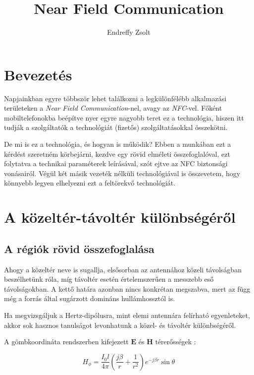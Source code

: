 \documentclass[12pt]{article}
\author{Endreffy Zsolt}
\title{Near Field Communication}
\begin{document}
\maketitle

\pagebreak

\tableofcontents

\pagebreak

\section{Bevezetés}
Napjainkban egyre többször lehet találkozni a legkülönfélébb alkalmazási 
területeken a \emph{Near Field Communication}-nel, avagy az \emph{NFC}-vel.
Főként mobiltelefonokba beépítve nyer egyre nagyobb teret ez a technológia,
hiszen itt tudják a szolgáltatók a technológiát (fizetős) szolgáltatásokkal
összekötni.

De mi is ez a technológia, és hogyan is működik?
Ebben a munkában ezt a kérdést szeretném körbejárni, kezdve egy rövid 
elméleti összefoglalóval, ezt folytatva a technikai paraméterek leírásával,
szót ejtve az NFC biztonsági vonásairól. Végül két másik vezeték nélküli
technológiával is összevetem, hogy könnyebb legyen elhelyezni ezt a 
feltörekvő technológiát.

\section{A közeltér-távoltér különbségéről}

\subsection{A régiók rövid összefoglalása}
Ahogy a közeltér neve is sugallja, elsősorban az antennához közeli távolságban
beszélhetünk róla, míg távoltér esetén értelemszerűen a messzebb eső 
távolságokban. A kettő határa azonban nincs konkrétan megszabva, mert az
függ még a forrás által sugárzott domináns hullámhossztól is.

Ha megvizsgáljuk a Hertz-dipólusra, mint elemi antennára felírható egyenleteket,
akkor sok hasznos tanulságot levonhatunk a közel- és távoltér különbségéről.

A gömbkoordináta rendszerben kifejezett $\mathbf{E}$ és $\mathbf{H}$ térerősségek
\cite[177.~oldal]{elektromagnesesterek}:

\begin{equation}
H_{\phi} =  \frac{I_0 l}{4 \pi}
\left( \frac{j\beta}{r} + \frac{1}{r^2} \right)
e^{-j\beta r} \sin \theta
\end{equation}
\end{document}
